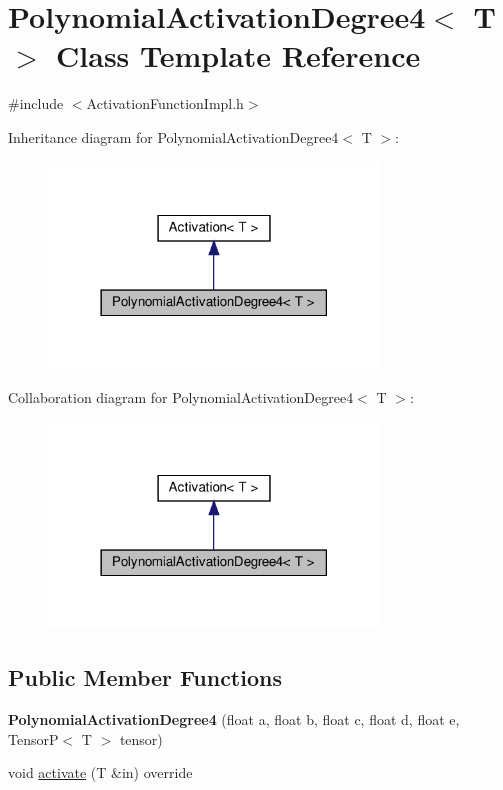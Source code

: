 \hypertarget{classPolynomialActivationDegree4}{}\section{Polynomial\+Activation\+Degree4$<$ T $>$ Class Template Reference}
\label{classPolynomialActivationDegree4}


{\ttfamily \#include $<$Activation\+Function\+Impl.\+h$>$}



Inheritance diagram for Polynomial\+Activation\+Degree4$<$ T $>$\+:
\nopagebreak
\begin{figure}[H]
\begin{center}
\leavevmode
\includegraphics[width=249pt]{classPolynomialActivationDegree4__inherit__graph}
\end{center}
\end{figure}


Collaboration diagram for Polynomial\+Activation\+Degree4$<$ T $>$\+:
\nopagebreak
\begin{figure}[H]
\begin{center}
\leavevmode
\includegraphics[width=249pt]{classPolynomialActivationDegree4__coll__graph}
\end{center}
\end{figure}
\subsection*{Public Member Functions}
\begin{DoxyCompactItemize}
\item 
\mbox{\label{classPolynomialActivationDegree4_af1eb8e637054087d2f95a2f40c0dfde0}} 
{\bfseries Polynomial\+Activation\+Degree4} (float a, float b, float c, float d, float e, TensorP$<$ T $>$ tensor)
\item 
void \hyperlink{classPolynomialActivationDegree4_a717e653fd47c869f7b7d257215f56548}{activate} (T \&in) override
\end{DoxyCompactItemize}
